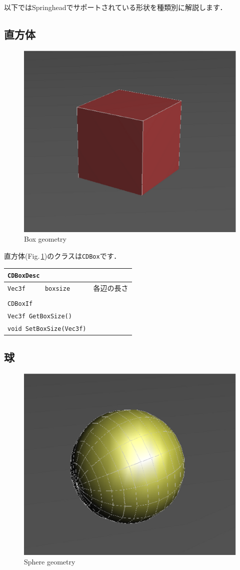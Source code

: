 \KLUDGE 以下ではSpringhead\KLUDGE でサポートされている形状を種類別に解説します．

\subsection*{\KLUDGE 直方体}

\begin{figure}[t]
\begin{center}
\includegraphics[width=.4\hsize]{fig/cdbox.eps}
\end{center}
\caption{Box geometry}
\label{fig_cdbox}
\end{figure}

\KLUDGE 直方体(Fig.\,\ref{fig_cdbox})\KLUDGE のクラスは\texttt{CDBox}\KLUDGE です．

\begin{center}
\begin{tabular}{lll}
\multicolumn{3}{l}{\texttt{CDBoxDesc}}					\\ \midrule
\texttt{Vec3f}	&	\texttt{boxsize}	& \KLUDGE 各辺の長さ 	\\
\\
\multicolumn{3}{l}{\texttt{CDBoxIf}}					\\ \midrule
\multicolumn{2}{l}{\texttt{Vec3f GetBoxSize()}}			\\
\multicolumn{2}{l}{\texttt{void SetBoxSize(Vec3f)}}		\\
\end{tabular}
\end{center}


\subsection*{\KLUDGE 球}

\begin{figure}[t]
\begin{center}
\includegraphics[width=.4\hsize]{fig/cdsphere.eps}
\end{center}
\caption{Sphere geometry}
\label{fig_cdsphere}
\end{figure}

